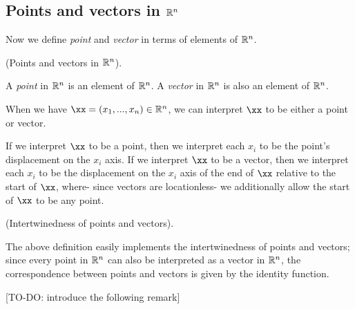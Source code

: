 \subsection*{Points and vectors in $\mathbb{R}^n$}

Now we define \textit{point} and \textit{vector} in terms of elements of $\mathbb{R}^n$.

\begin{defn}
    (Points and vectors in $\mathbb{R}^n$).
    
    A \textit{point} in $\mathbb{R}^n$ is an element of $\mathbb{R}^n$. A \textit{vector} in $\mathbb{R}^n$ is also an element of $\mathbb{R}^n$.
    
    When we have $\xx = (x_1, ..., x_n) \in \R^n$, we can interpret $\xx$ to be either a point or vector. 
    
    If we interpret $\xx$ to be a point, then we interpret each $x_i$ to be the point's displacement on the $x_i$ axis. If we interpret $\xx$ to be a vector, then we interpret each $x_i$ to be the displacement on the $x_i$ axis of the end of $\xx$ relative to the start of $\xx$, where- since vectors are locationless- we additionally allow the start of $\xx$ to be any point.
\end{defn}

\begin{remark}
    (Intertwinedness of points and vectors).
    
    The above definition easily implements the intertwinedness of points and vectors; since every point in $\mathbb{R}^n$ can also be interpreted as a vector in $\mathbb{R}^n$, the correspondence between points and vectors is given by the identity function.
\end{remark}

[TO-DO: introduce the following remark]

